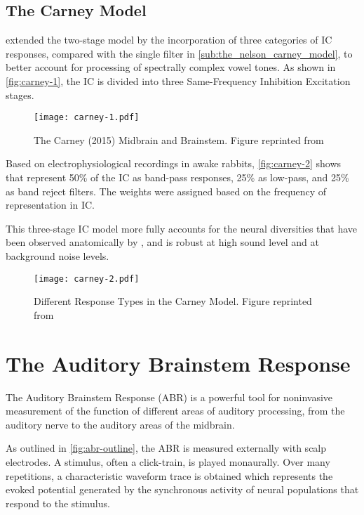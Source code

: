 \subsection{The Carney Model} %
\label{sub:the_carney_model}
\cite{Carney2015Speech} extended the two-stage \cite{Nelson2004Phenomenological} model by the incorporation of three categories of IC responses, compared with the single filter in \autoref{sub:the_nelson_carney_model}, to better account for processing of spectrally complex vowel tones.  As shown in \autoref{fig:carney-1}, the IC is divided into three Same-Frequency Inhibition Excitation stages. 
\begin{figure}[htbp]
	\centering
	\texttt{[image: carney-1.pdf]}
	\caption[The Carney 2015 Model]{The Carney (2015) Midbrain and Brainstem.  Figure reprinted from~\cite{Carney2015Speech}}
	\label{fig:carney-1}
\end{figure}


Based on electrophysiological recordings in awake rabbits, \autoref{fig:carney-2} shows that \cite{Carney2015Speech} represent 50\% of the IC as band-pass responses, 25\% as low-pass, and 25\% as band reject filters.  The weights were assigned based on the frequency of representation in IC.  

This three-stage IC model more fully accounts for the neural diversities that have been observed anatomically by \cite{Beebe2016Extracellular}, and is robust at high sound level and at background noise levels. 

\begin{figure}[htbp]
	\centering
	\texttt{[image: carney-2.pdf]}
	\caption[Three Carney IC Response Types]{Different Response Types in the Carney Model.  Figure reprinted from~\cite{Carney2015Speech}}
	\label{fig:carney-2}
\end{figure}

\section{The Auditory Brainstem Response} %
\label{sec:the_auditory_brainstem_response}
The Auditory Brainstem Response (ABR) is a powerful tool for noninvasive measurement of the function of different areas of auditory processing, from the auditory nerve to the auditory areas of the midbrain. 

As outlined in \autoref{fig:abr-outline}, the ABR is measured externally with scalp electrodes.  A stimulus, often a click-train, is played monaurally.  Over many repetitions, a characteristic waveform trace is obtained which represents the evoked potential generated by the synchronous activity of neural populations that respond to the stimulus. 

